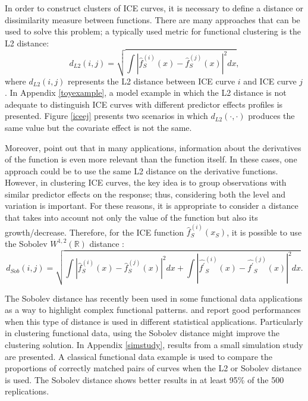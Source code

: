 \documentclass[smallextended,natbib]{svjour3}\usepackage[]{graphicx}\usepackage[]{xcolor}
\begin{document}
In order to construct clusters of ICE curves, it is necessary to define a distance or dissimilarity measure between functions. There are many approaches that can be used to solve this problem; a typically used metric for functional clustering is the L2 distance: 
\[ d_{L2}(i, j) = \sqrt{ \int |\hat{f}_{S}^{(i)}(x) - \hat{f}_{S}^{(j)}(x)|^2dx}, \] 
where $d_{L2}(i, j)$ represents the L2 distance between ICE curve $i$ and ICE curve $j$. In Appendix \ref{toyexample}, a model example in which the L2 distance is not adequate to distinguish ICE curves with different predictor effects profiles is presented. Figure \ref{iceej} presents two scenarios in which $d_{L2}(\cdot,\cdot)$ produces the same value but the covariate effect is not the same. 

Moreover, \cite{hitchcock2015clustering} point out that in many applications, information about the derivatives of the function is even more relevant than the function itself.  In these cases, one approach could be to use the same L2 distance on the derivative functions. However, in clustering ICE curves, the key idea is to group observations with similar predictor effects on the response; thus, considering both the level and variation is important. For these reasons, it is appropriate to consider a distance that takes into account not only the value of the function but also its growth/decrease. Therefore, for the ICE function $\hat{f}_{S}^{(i)}(x_S)$, it is possible to use the Sobolev $W^{1,2}(\mathbb{R})$ distance \citep{sobolev}:  
\begin{equation}
\label{sobodis}
d_{Sob}(i, j) = \sqrt{ \int |\hat{f}_{S}^{(i)}(x) - \hat{f}_{S}^{(j)}(x)|^2dx + \int |\hat{f^{'}}_{S}^{(i)}(x) - \hat{f^{'}}_{S}^{(j)}(x)|^2dx}.    
\end{equation}  

The Sobolev distance has recently been used in some functional data applications as a way to highlight complex functional patterns. \cite{cremona2023probabilistic} and \cite{ehsani2020robust} report good performances when this type of distance is used in different statistical applications. Particularly in clustering functional data, using the Sobolev distance might improve the clustering solution. In Appendix \ref{simstudy}, results from a small simulation study are presented.  A classical functional data example \citep{hitchcock2007effect} is used to compare the proportions of correctly matched pairs of curves when the L2 or Sobolev distance is used. The Sobolev distance shows better results in at least 95\% of the 500 replications.   
\end{document}
